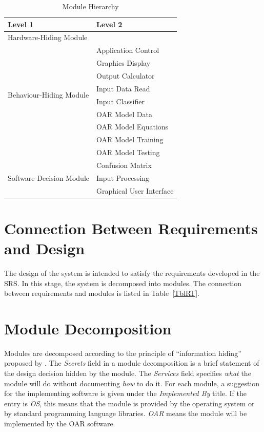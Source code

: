 \documentclass[12pt, titlepage]{article}
\begin{document}
\begin{table}[h!]
\centering
\begin{tabular}{p{} p{}}
\toprule
\textbf{Level 1} & \textbf{Level 2}\\
\midrule
  
{Hardware-Hiding Module} & ~\\
\midrule
  
\multirow{8}{0.3\textwidth}{Behaviour-Hiding Module}
  & Application Control \\
  & Graphics Display \\
  & Output Calculator\\
  & Input Data Read \\
  & Input Classifier\\
  & OAR Model Data  \\
  & OAR Model Equations \\
  & OAR Model Training \\
  & OAR Model Testing \\
  \midrule
  
  \multirow{3}{0.3\textwidth}{Software Decision Module}
    & Confusion Matrix \\
    & Input Processing \\
    & Graphical User Interface \\
  \bottomrule
  
  \end{tabular}
\caption{Module Hierarchy}
\label{TblMH}
\end{table}

\section{Connection Between Requirements and Design} \label{SecConnection}

The design of the system is intended to satisfy the requirements developed in
the SRS. In this stage, the system is decomposed into modules. The connection
between requirements and modules is listed in Table~\ref{TblRT}.

\section{Module Decomposition} \label{SecMD}

Modules are decomposed according to the principle of ``information hiding''
proposed by \citet{ParnasEtAl1984}. The \emph{Secrets} field in a module
decomposition is a brief statement of the design decision hidden by the
module. The \emph{Services} field specifies \emph{what} the module will do
without documenting \emph{how} to do it. For each module, a suggestion for the
implementing software is given under the \emph{Implemented By} title. If the
entry is \emph{OS}, this means that the module is provided by the operating
system or by standard programming language libraries.  \emph{OAR} means the
module will be implemented by the OAR software.
\end{document}
